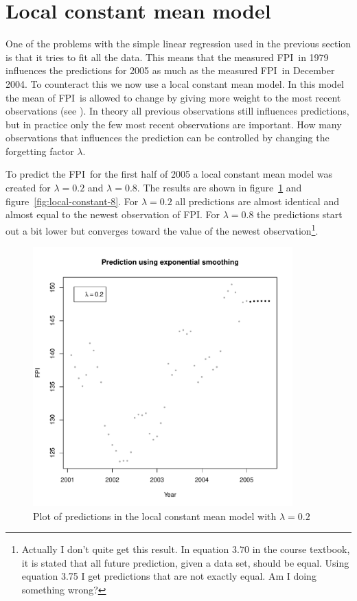 \documentclass[11pt]{article}
\newcommand\fpi{FPI}
\begin{document}
\section*{Local constant mean model}
One of the problems with the simple linear regression used in the previous section is that it tries to fit all the data. This means that the measured \fpi\ in 1979 influences the predictions for 2005 as much as the measured \fpi\ in December 2004. To counteract this we now use a local constant mean model. In this model the mean of \fpi\ is allowed to change by giving more weight to the most recent observations (see \cite[p. 50]{hm}). In theory all previous observations still influences predictions, but in practice only the few most recent observations are important. How many observations that influences the prediction can be controlled by changing the forgetting factor $\lambda$. \par
To predict the \fpi\ for the first half of 2005 a local constant mean model was created for $\lambda=0.2$ and $\lambda=0.8$. The results are shown in figure~\ref{fig:local-constant-2} and figure~\ref{fig:local-constant-8}. For $\lambda=0.2$ all predictions are almost identical and almost equal to the newest observation of \fpi. For $\lambda=0.8$ the predictions start out a bit lower but converges toward the value of the newest observation\footnote{Actually I don't quite get this result. In equation $3.70$ in the course textbook, it is stated that all future prediction, given a data set, should be equal. Using equation 3.75 I get predictions that are not exactly equal. Am I doing something wrong?}.


\begin{figure}
    \centering
    \includegraphics[width=100mm]{exp-smoothing-lambda-2.pdf}
    \caption{Plot of predictions in the local constant mean model with $\lambda=0.2$}
    \label{fig:local-constant-2}
\end{figure}
\end{document}
